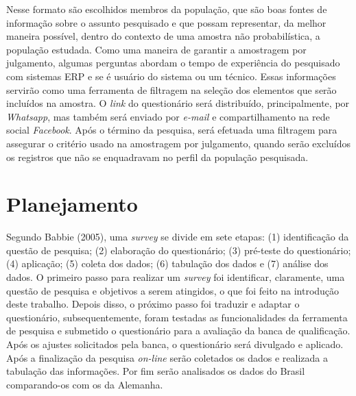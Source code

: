 \indent Nesse formato são escolhidos membros da população, que são boas fontes de informação sobre o assunto pesquisado e que possam representar, da melhor maneira possível, dentro do contexto de uma amostra não probabilística, a população estudada.\newline
\indent Como uma maneira de garantir a amostragem por julgamento, algumas perguntas abordam o tempo de experiência do pesquisado com sistemas ERP e se é usuário do sistema ou um técnico. Essas informações servirão como uma ferramenta de filtragem na seleção dos elementos que serão incluídos na amostra.\newline
\indent O \textit{link} do questionário será distribuído, principalmente, por \textit{Whatsapp}, mas também será enviado por \textit{e-mail} e compartilhamento na rede social \textit{Facebook}.\newline
\indent Após o término da pesquisa, será efetuada uma filtragem para assegurar o critério usado na amostragem por julgamento, quando serão excluídos os registros que não se enquadravam no perfil da população pesquisada.

\section{Planejamento} \label{Planejamento}

Segundo Babbie (2005), uma \textit{survey} se divide em sete etapas: (1) identificação da questão de pesquisa; (2) elaboração do questionário; (3) pré-teste do questionário; (4) aplicação; (5) coleta dos dados; (6) tabulação dos dados e (7) análise dos dados.\newline
\indent O primeiro passo para realizar um \textit{survey} foi identificar, claramente, uma questão de pesquisa e objetivos a serem atingidos, o que foi feito na introdução deste trabalho. Depois disso, o próximo passo foi traduzir e adaptar o questionário, subsequentemente, foram testadas as funcionalidades da ferramenta de pesquisa e submetido o questionário para a avaliação da banca de qualificação. Após os ajustes solicitados pela banca, o questionário será divulgado e aplicado.\newline
\indent Após a finalização da pesquisa \textit{on-line} serão coletados os dados e realizada a tabulação das informações. Por fim serão analisados os dados do Brasil comparando-os com os da Alemanha.
